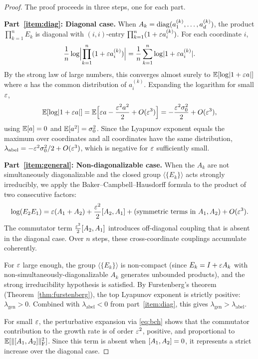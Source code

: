 \begin{proof}
The proof proceeds in three steps, one for each part.

\medskip
\noindent\textbf{Part~\ref{item:diag}: Diagonal case.}
When $A_k = \operatorname{diag}(a_1^{(k)}, \ldots, a_d^{(k)})$, the product
$\prod_{k=1}^n E_k$ is diagonal with $(i,i)$-entry
$\prod_{k=1}^n (1 + \varepsilon a_i^{(k)})$.  For each coordinate $i$,
\[
  \frac{1}{n} \log \Bigl\lvert \prod_{k=1}^n (1 + \varepsilon a_i^{(k)}) \Bigr\rvert
  = \frac{1}{n} \sum_{k=1}^n \log \lvert 1 + \varepsilon a_i^{(k)} \rvert.
\]
By the strong law of large numbers, this converges almost surely to
$\mathbb{E}[\log \lvert 1 + \varepsilon a \rvert]$ where $a$ has the common distribution of
$a_i^{(k)}$.  Expanding the logarithm for small $\varepsilon$,
\[
  \mathbb{E}[\log\lvert 1 + \varepsilon a \rvert]
  = \mathbb{E}\Bigl[\varepsilon a - \frac{\varepsilon^2 a^2}{2} + O(\varepsilon^3)\Bigr]
  = -\frac{\varepsilon^2 \sigma_0^2}{2} + O(\varepsilon^3),
\]
using $\mathbb{E}[a] = 0$ and $\mathbb{E}[a^2] = \sigma_0^2$.  Since the Lyapunov
exponent equals the maximum over coordinates and all coordinates have
the same distribution, $\lambda_{\mathrm{abel}}
= -\varepsilon^2 \sigma_0^2 / 2 + O(\varepsilon^3)$, which is negative for
$\varepsilon$ sufficiently small.

\medskip
\noindent\textbf{Part~\ref{item:general}: Non-diagonalizable case.}
When the $A_k$ are not simultaneously diagonalizable and the closed
group $\langle \{E_k\} \rangle$ acts strongly irreducibly, we apply
the Baker--Campbell--Hausdorff formula to the product of two consecutive
factors:
\begin{equation}\label{eq:bch}
  \log(E_2 E_1)
  = \varepsilon(A_1 + A_2) + \frac{\varepsilon^2}{2}[A_2, A_1]
    + \text{(symmetric terms in } A_1, A_2\text{)} + O(\varepsilon^3).
\end{equation}
The commutator term $\frac{\varepsilon^2}{2}[A_2, A_1]$ introduces
off-diagonal coupling that is absent in the diagonal case.  Over $n$
steps, these cross-coordinate couplings accumulate coherently.

For $\varepsilon$ large enough, the group $\langle \{E_k\} \rangle$ is
non-compact (since $E_k = I + \varepsilon A_k$ with non-simultaneously-diagonalizable
$A_k$ generates unbounded products), and the strong irreducibility
hypothesis is satisfied.  By Furstenberg's theorem
(Theorem~\ref{thm:furstenberg}), the top Lyapunov exponent is strictly
positive: $\lambda_{\mathrm{gen}} > 0$.  Combined with
$\lambda_{\mathrm{abel}} < 0$ from part~\ref{item:diag}, this gives
$\lambda_{\mathrm{gen}} > \lambda_{\mathrm{abel}}$.

For small $\varepsilon$, the perturbative expansion via \eqref{eq:bch} shows
that the commutator contribution to the growth rate is of order $\varepsilon^2$,
positive, and proportional to $\mathbb{E}[\lVert [A_1, A_2] \rVert_{\mathrm{F}}^2]$.
Since this term is absent when $[A_1, A_2] = 0$, it represents
a strict increase over the diagonal case.


\end{proof}
